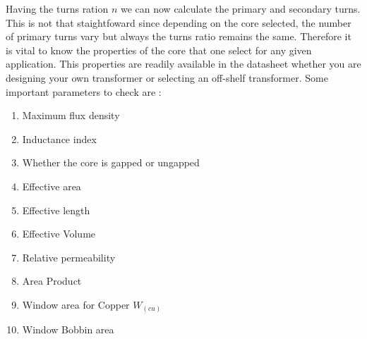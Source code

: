 \documentclass{article}
\begin{document}
Having the turns ration $n$ we can now calculate the primary and secondary turns. This is not that staightfoward since depending on the core selected, the number of primary
turns vary but always the turns ratio remains the same. Therefore it is vital to know the properties of the core that one select for any given application. This properties are 
readily available in the datasheet whether you are designing your own transformer or selecting an off-shelf transformer. Some important parameters to check are : \begin{enumerate}
    \item Maximum flux density
    \item Inductance index
    \item Whether the core is gapped or ungapped
    \item Effective area
    \item Effective length
    \item Effective Volume
    \item Relative permeability
    \item Area Product
    \item Window area for Copper $W_(cu)$
    \item Window Bobbin area
\end{enumerate}
\end{document}
